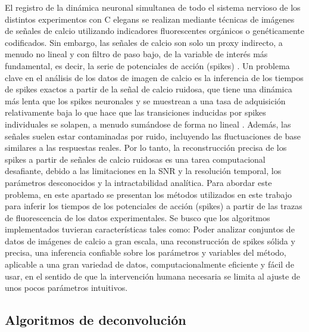 El registro de la dinámica neuronal  simultanea de todo el sistema nervioso  de los distintos experimentos con  C elegans   se realizan mediante técnicas de  imágenes de señales de calcio  utilizando indicadores fluorescentes orgánicos o genéticamente codificados. Sin embargo, las señales de calcio son solo un proxy indirecto, a menudo no lineal y con filtro de paso bajo, de la variable de interés más fundamental, es decir, la serie de potenciales de acción (spikes) \cite{rupprecht_database_2021}. Un  problema clave en el análisis de los datos de imagen de calcio es la inferencia de los tiempos de spikes exactos a partir de la señal de calcio ruidosa, que tiene una dinámica más lenta que los spikes neuronales y se muestrean a una tasa de adquisición relativamente baja lo que hace que las transiciones inducidas por spikes individuales se solapen, a menudo sumándose de forma no lineal \cite{pnevmatikakis_bayesian_2013}. Además, las señales suelen estar contaminadas por  ruido, incluyendo las fluctuaciones de base similares a las respuestas reales.  Por lo tanto, la reconstrucción precisa de los spikes a partir de señales de calcio ruidosas es  una tarea computacional desafiante, debido a las limitaciones en la \gls{SNR} y la resolución temporal, los parámetros desconocidos y la intractabilidad analítica.  Para abordar este problema,  en este apartado se presentan los métodos  utilizados en este trabajo para inferir los tiempos de los potenciales de acción (spikes) a partir de las trazas de fluorescencia de los datos experimentales. Se busco que los algoritmos implementados   tuvieran  características tales como:  Poder analizar conjuntos de datos de imágenes de calcio a gran escala,   una reconstrucción de spikes sólida y precisa, una inferencia confiable sobre los parámetros y variables del método,  aplicable a una gran variedad de datos, computacionalmente eficiente y fácil de usar, en el sentido de que la intervención humana necesaria se limita al ajuste de unos pocos parámetros intuitivos.

\subsection{Algoritmos de deconvolución}


